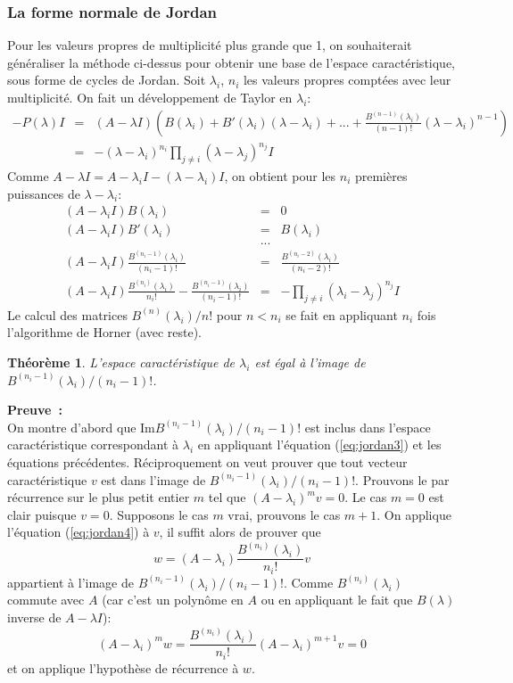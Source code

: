 \documentclass[a4paper,11pt]{article}
\newtheorem{thm}{Théorème}
\begin{document}
\subsubsection{La forme normale de Jordan} \label{sec:jordan}
Pour les valeurs propres de multiplicit\'e plus grande que 1, on souhaiterait 
g\'en\'eraliser la m\'ethode ci-dessus pour obtenir une base
de l'espace caractéristique, sous forme de cycles de Jordan.
Soit $\lambda _i$, $n_i$ les valeurs propres compt\'ees avec leur 
multiplicit\'e. On fait un d\'eveloppement de Taylor en
$\lambda _i$:
\begin{eqnarray*} 
-P(\lambda )I&=&(A-\lambda I)\left(
B(\lambda_i )+ B'(\lambda _i)(\lambda -\lambda _i)
+ ... +  \frac{B^{(n-1)}(\lambda_i )}{(n-1)!} 
(\lambda -\lambda _i)^{n-1} \right) \\
&=& -(\lambda -\lambda _i)^{n_i}
\prod _{j\neq i} (\lambda -\lambda _j)^{n_j} I 
\end{eqnarray*}
Comme $A-\lambda I=A-\lambda _i I - (\lambda -\lambda _i)I$, on obtient
pour les $n_i$ premi\`eres puissances de $\lambda -\lambda _i$:
\begin{eqnarray} \label{eq:jordan1}
(A-\lambda _i I) B(\lambda _i)&=&0\\
(A-\lambda _i I) B'(\lambda _i)&=&B(\lambda_i )\\
& ... & \\
(A-\lambda _i I) \frac{B^{(n_i-1)}(\lambda _i)}{(n_i-1)!} &=& 
\frac{B^{(n_i-2)}(\lambda _i)}{(n_i-2)!} \label{eq:jordan3} \\
(A-\lambda _i I)\frac{B^{(n_i)}(\lambda_i)}{n_i!} -  
\frac{B^{(n_i-1)}(\lambda_i)}{(n_i-1)!}
&= &-\prod_{j\neq i}(\lambda _i-\lambda _j)^{n_j} I \label{eq:jordan4}
\end{eqnarray}
Le calcul des matrices $B^{(n)}(\lambda _i)/n!$ pour $n<n_i$ se fait en
appliquant $n_i$ fois l'algorithme de Horner (avec reste).

\begin{thm} \label{th:jordan}
L'espace caract\'eristique de $\lambda _i$ est égal à
l'image de $B^{(n_i-1)}(\lambda _i)/(n_i-1)!$.
\end{thm}
{\bf Preuve~:}\\
On montre d'abord que Im$B^{(n_i-1)}(\lambda _i)/(n_i-1)!$ est inclus
dans l'espace caractéristique correspondant à $\lambda_i$ en
appliquant l'\'equation (\ref{eq:jordan3}) et les \'equations précédentes.
Réciproquement on veut prouver que tout vecteur caract\'eristique $v$ est dans 
l'image de $B^{(n_i-1)}(\lambda _i)/(n_i-1)!$. Prouvons le par r\'ecurrence
sur le plus petit entier $m$ tel que
$(A-\lambda _i)^{m}v=0$. Le cas $m=0$ est clair puisque $v=0$.
Supposons le cas $m$ vrai, prouvons le cas $m+1$. On applique l'\'equation
(\ref{eq:jordan4}) \`a $v$, il suffit alors de prouver que
\[ w=(A-\lambda _i)\frac{B^{(n_i)}(\lambda_i)}{n_i!} v\]
appartient \`a l'image de
$B^{(n_i-1)}(\lambda _i)/(n_i-1)!$.
Comme $B^{(n_i)}(\lambda_i)$
commute avec $A$ (car c'est un polyn\^ome en $A$ ou en appliquant
le fait que $B(\lambda)$ inverse de $A-\lambda I$):
\[ (A-\lambda _i)^m w=\frac{B^{(n_i)}(\lambda_i)}{n_i!} 
(A-\lambda _i)^{m+1}v=0 \]
et on applique l'hypoth\`ese de r\'ecurrence \`a $w$.
\end{document}
